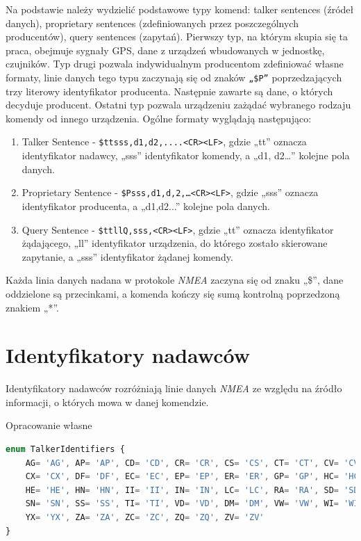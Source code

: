 \documentclass[skorowidz,skroty]{dyplomWEZUT}
\begin{document}
Na podstawie \cite{NMEA0183} należy wydzielić podstawowe typy komend: talker sentences (źródeł danych), proprietary sentences (zdefiniowanych przez poszczególnych producentów), query sentences (zapytań). Pierwszy typ, na którym skupia się ta praca, obejmuje sygnały GPS,  dane z urządzeń wbudowanych w jednostkę, czujników. Typ drugi pozwala indywidualnym producentom zdefiniować własne formaty, linie danych tego typu zaczynają się od znaków \texttt{„\$P”} poprzedzających trzy literowy identyfikator producenta. Następnie zawarte są dane, o których decyduje producent. Ostatni typ pozwala urządzeniu zażądać wybranego rodzaju komendy od innego urządzenia. Ogólne formaty wyglądają następująco:
\begin{enumerate}
\item Talker Sentence - \texttt{\$ttsss,d1,d2,....<CR><LF>}, gdzie „tt” oznacza identyfikator nadawcy, „sss” identyfikator komendy, a „d1, d2…” kolejne pola danych. 
\item Proprietary Sentence - \texttt{\$Psss,d1,d,2,…<CR><LF>}, gdzie „sss” oznacza identyfikator producenta, a „d1,d2...” kolejne pola danych.
\item Query Sentence - \texttt{\$ttllQ,sss,<CR><LF>}, gdzie „tt” oznacza identyfikator żądającego, „ll” identyfikator urządzenia, do którego zostało skierowane zapytanie, a „sss” identyfikator żądanej komendy.
\end{enumerate}
Każda linia danych nadana w protokole \textit{NMEA} zaczyna się od znaku „\$”, dane oddzielone są przecinkami, a komenda kończy się sumą kontrolną poprzedzoną znakiem „*”.

\section{Identyfikatory nadawców}\label{sec:talker ids}
Identyfikatory nadawców rozróżniają linie danych \textit{NMEA} ze względu na źródło informacji, o których mowa w danej komendzie.

{Opracowanie własne \cite{gpsinformation, Raymond2019}}{\label{code:Talkers enum}}
\begin{lstlisting}[language=JavaScript]
enum TalkerIdentifiers {
    AG= 'AG', AP= 'AP', CD= 'CD', CR= 'CR', CS= 'CS', CT= 'CT', CV= 'CV',
    CX= 'CX', DF= 'DF', EC= 'EC', EP= 'EP', ER= 'ER', GP= 'GP', HC= 'HC',
    HE= 'HE', HN= 'HN', II= 'II', IN= 'IN', LC= 'LC', RA= 'RA', SD= 'SD',
    SN= 'SN', SS= 'SS', TI= 'TI', VD= 'VD', DM= 'DM', VW= 'VW', WI= 'WI',
    YX= 'YX', ZA= 'ZA', ZC= 'ZC', ZQ= 'ZQ', ZV= 'ZV'
}
\end{lstlisting}
\end{document}
